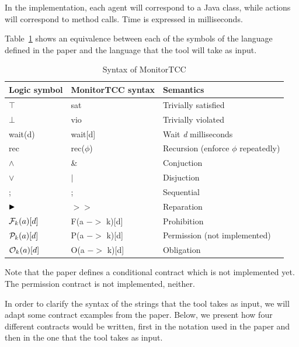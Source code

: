 \documentclass{article}
\begin{document}
In the implementation, each agent will correspond to a Java class, while actions will correspond to method calls. Time is expressed in milliseconds.

Table~\ref{t:symbols} shows an equivalence between each of the symbols of the language defined in the paper and the language that the tool will take as input.

\begin{table}[hp]
\centering
\caption{Syntax of MonitorTCC}
\label{my-label}
\small
\begin{tabular}{|l|l|l|}\hline
 Logic symbol & MonitorTCC syntax & Semantics \\ \hline
 $\top$ & sat & Trivially satisfied                                    \\
 $\bot$ & vio & Trivially violated                                    \\
 wait(d) & wait[d] & Wait \textit{d} milliseconds                                   \\
 rec & rec($\phi$) & Recursion (enforce $\phi$ repeatedly)        \\
 $\wedge$ & \& & Conjuction                                     \\
 $\vee$ & $|$  & Disjuction                                     \\
; & ; & Sequential                                      \\
  $\blacktriangleright$ & $>>$ & Reparation            \\
  ${\mathcal{F}_{k}(a)}[d]$  & F(a $->$ k){[}d{]} & Prohibition \\
  ${\mathcal{P}_{k}(a)}[d]$  & P(a $->$ k){[}d{]} & Permission (not implemented) \\
  ${\mathcal{O}_{k}(a)}[d]$  & O(a $->$ k){[}d{]} & Obligation                              \\\hline
\end{tabular}
\normalsize
\label{t:symbols}
\end{table}

Note that the paper defines a conditional contract which is not implemented yet. The permission contract is not implemented, neither.

In order to clarify the syntax of the strings that the tool takes as input, we will adapt some contract examples from the paper. Below, we present how four different contracts would be written, first in the notation used in the paper and then in the one that the tool takes as input. \\
\end{document}
